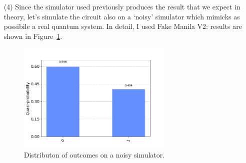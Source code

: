 \documentclass[12pt]{article}
\begin{document}
\begin{itemize}
\item[(4)]
Since the simulator used previously produces the result that we expect in theory,
let's simulate the circuit also on a `noisy' simulator which mimicks as possibile 
a real quantum system. In detail, I used Fake Manila V2: results are shown in 
Figure~\ref{fig:n_distribution}.
\begin{figure}[h]
    \centering
    \includegraphics[width=0.7\textwidth]{images/c5_noisy_distribution.png}
    \caption{Distributon of outcomes on a noisy simulator.}
    \label{fig:n_distribution}
\end{figure}

\end{itemize}
\end{document}

